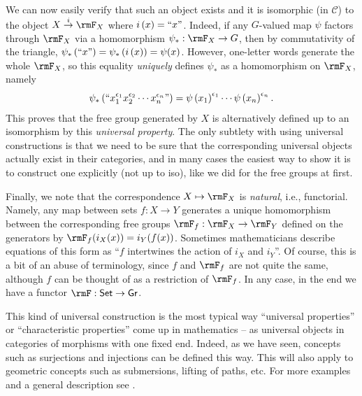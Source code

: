 \begin{example}
We can now easily verify that such an object exists and it is isomorphic
(in $\mathcal{C}$) to the object $X\overset{i}{\to}\rmF_{X}$ where
$i\left(x\right)=``x"$. Indeed, if any $G$-valued map $\psi$ factors
through $\rmF_{X}$ via a homomorphism $\psi_{\ast}:\rmF_{X}\to G$, then
by commutativity of the triangle, $\psi_{\ast}\left(``x"\right)=\psi_{\ast}\left(i\left(x\right)\right)=\psi(x)$.
However, one-letter words generate the whole $\rmF_{X}$, so this equality
\emph{uniquely} defines $\psi_{\ast}$ as a homomorphism on $\rmF_{X}$,
namely
\begin{equation}
\psi_{\ast}\left(``x_{1}^{\epsilon_{1}}x_{2}^{\epsilon_{2}}\cdots x_{n}^{\epsilon_{n}}"\right)=\psi\left(x_{1}\right)^{\epsilon_{1}}\cdots\psi\left(x_{n}\right)^{\epsilon_{n}}.
\end{equation}
This proves that the free group generated by $X$ is alternatively
defined up to an isomorphism by this \emph{universal property}.
The only subtlety with using universal constructions is that we need
to be sure that the corresponding universal objects actually exist
in their categories, and in many cases the easiest way to show it
is to construct one explicitly (not up to iso), like we did for the
free groups at first.

Finally, we note that the correspondence $X\mapsto \rmF_X$ is \emph{natural}, i.e., functorial. Namely, any map between sets $f:X\to Y$ generates a unique homomorphism between the corresponding free groups $\rmF_f:\rmF_X\to \rmF_Y$ defined on the generators by $\rmF_f (i_X(x))=i_Y(f(x))$. Sometimes mathematicians describe equations of this form as ``$f$ intertwines the action of $i_X$ and $i_Y$''. Of course, this is a bit of an abuse of terminology, since $f$ and $\rmF_f$ are not quite the same, although $f$ can be thought of as a restriction of $\rmF_f$. In any case, in the end we have a functor $\rmF:\mathsf{Set}\to\mathsf{Gr}$.

This kind of universal construction is the most typical way ``universal properties'' or ``characteristic properties'' come up in mathematics -- as universal objects in categories of morphisms with one fixed end. Indeed, as we have seen, concepts such as surjections and injections can be defined this way. This will also apply to geometric concepts such as submersions, lifting of paths, etc. For more examples and a general description see \cite[Exercise~7.8:24 and Def.~7.8:12]{Bergman}.
\end{example}
